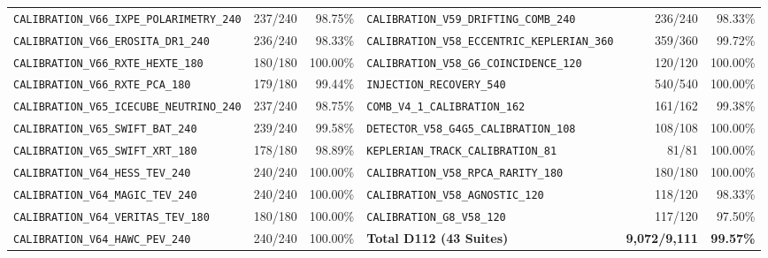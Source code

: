 \documentclass[twocolumn,10pt]{article}
\begin{document}
\begin{table}[!ht]
{\begin{tabular}{lrr|lrr}
\texttt{CALIBRATION\_V66\_IXPE\_POLARIMETRY\_240} & 237/240 & 98.75\% & \texttt{CALIBRATION\_V59\_DRIFTING\_COMB\_240} & 236/240 & 98.33\% \\
\texttt{CALIBRATION\_V66\_EROSITA\_DR1\_240} & 236/240 & 98.33\% & \texttt{CALIBRATION\_V58\_ECCENTRIC\_KEPLERIAN\_360} & 359/360 & 99.72\% \\
\texttt{CALIBRATION\_V66\_RXTE\_HEXTE\_180} & 180/180 & 100.00\% & \texttt{CALIBRATION\_V58\_G6\_COINCIDENCE\_120} & 120/120 & 100.00\% \\
\texttt{CALIBRATION\_V66\_RXTE\_PCA\_180} & 179/180 & 99.44\% & \texttt{INJECTION\_RECOVERY\_540} & 540/540 & 100.00\% \\
\texttt{CALIBRATION\_V65\_ICECUBE\_NEUTRINO\_240} & 237/240 & 98.75\% & \texttt{COMB\_V4\_1\_CALIBRATION\_162} & 161/162 & 99.38\% \\
\texttt{CALIBRATION\_V65\_SWIFT\_BAT\_240} & 239/240 & 99.58\% & \texttt{DETECTOR\_V58\_G4G5\_CALIBRATION\_108} & 108/108 & 100.00\% \\
\texttt{CALIBRATION\_V65\_SWIFT\_XRT\_180} & 178/180 & 98.89\% & \texttt{KEPLERIAN\_TRACK\_CALIBRATION\_81} & 81/81 & 100.00\% \\
\texttt{CALIBRATION\_V64\_HESS\_TEV\_240} & 240/240 & 100.00\% & \texttt{CALIBRATION\_V58\_RPCA\_RARITY\_180} & 180/180 & 100.00\% \\
\texttt{CALIBRATION\_V64\_MAGIC\_TEV\_240} & 240/240 & 100.00\% & \texttt{CALIBRATION\_V58\_AGNOSTIC\_120} & 118/120 & 98.33\% \\
\texttt{CALIBRATION\_V64\_VERITAS\_TEV\_180} & 180/180 & 100.00\% & \texttt{CALIBRATION\_G8\_V58\_120} & 117/120 & 97.50\% \\
\texttt{CALIBRATION\_V64\_HAWC\_PEV\_240} & 240/240 & 100.00\% & \textbf{Total D112 (43 Suites)} & \textbf{9,072/9,111} & \textbf{99.57\%} \\
\bottomrule
\end{tabular}%
}
\end{table}
\end{document}
